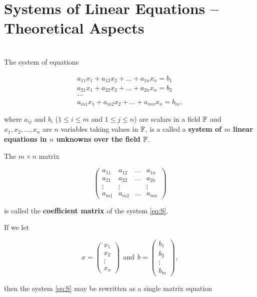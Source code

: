 \section{Systems of Linear Equations -- Theoretical Aspects}

\begin{definition}
	\hfill\\
	The system of equations 
	
	\begin{equation}\label{eq:S}
		\tag{S}
		\begin{split}
			a_{11}x_1 + a_{12}x_2 + \dots + a_{1n}x_n = b_1\\
			a_{21}x_1 + a_{22}x_2 + \dots + a_{2n}x_n = b_2\\
			\dots \\
			a_{m1}x_1 + a_{m2}x_2 + \dots + a_{mn}x_n = b_m,
		\end{split}
	\end{equation}
	
	where $a_{ij}$ and $b_i$ ($1 \leq i \leq m$ and $1 \leq j \leq n$) are scalars in a field $\mathbb{F}$ and $x_1, x_2, \dots, x_n$ are $n$ variables taking values in $\mathbb{F}$, is a called a \textbf{system of $m$ linear equations in $n$ unknowns over the field $\mathbb{F}$}.
	
	The $m \times n$ matrix 
	
	\[\begin{pmatrix}
		a_{11} & a_{12} & \dots & a_{1n} \\
		a_{21} & a_{22} & \dots & a_{2n} \\
		\vdots & \vdots & & \vdots \\
		a_{m1} & a_{m2} & \dots & a_{mn}
	\end{pmatrix}\]
	
	is called the \textbf{coefficient matrix} of the system \eqref{eq:S}.
	
	If we let
	
	\[x = \begin{pmatrix}
		x_1 \\ x_2 \\ \vdots \\ x_n
	\end{pmatrix}\ \ \text{and}\ \ b = \begin{pmatrix}
	b_1 \\ b_2 \\ \vdots \\ b_m
	\end{pmatrix},\]
	
	then the system \eqref{eq:S} may be rewritten as a single matrix equation
	

\end{definition}
